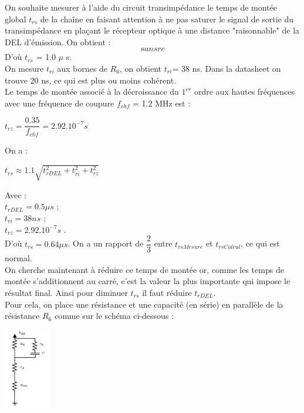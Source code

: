 \documentclass[a4paper]{report}
\begin{document}
On souhaite mesurer à l'aide du circuit transimpédance le temps de montée global $t_{rs}$ de la chaîne en faisant attention à ne pas saturer le signal de sortie du transimpédance en plaçant le récepteur optique à une distance "raisonnable" de la DEL d'émission. On obtient : \\
$$sansrc$$
D'où $t_{rs}$ = 1.0 $\mu$ s.\\
On mesure $t_{ri}$ aux bornes de $R_6$, on obtient $t_{ri}$= 38 ns. Dans la datasheet on trouve 20 ns, ce qui est plus ou moins cohérent.\\
Le temps de montée associé à la décroissance du $1^{er}$ ordre aux hautes fréquences avec une fréquence de coupure $f_{chf}$ = 1.2 MHz est : 
\begin{center}
$t_{rz}  = \dfrac{0.35}{f_{chf} } = 2.92.10^{-7} s$

\end{center}

On a : \\
\begin{center}
$t_{rs} \approx 1.1 \sqrt{t_{rDEL}^2 + t_{ri}^2 + t_{rz}^2 } $
\end{center}
Avec : \\
$t_{rDEL} = 0.5 \mu s$ ;\\
$t_{ri} =38 ns$ ; \\
$ t_{rz} = 2.92.10^{-7}s$ .\\
D'où $t_{rs} = 0.64 \mu  s$.
On a un rapport de $\dfrac{2}{3}$ entre $t_{rsMesure}$ et $t_{rsCalcul}$, ce qui est normal.\\
On cherche maintenant à réduire ce temps de montée or, comme les temps de montée s'additionnent au carré, c'est la valeur la plus importante qui impose le résultat final. Ainsi pour diminuer $t_{rs}$ il faut réduire $t_{rDEL}$.\\


Pour cela, on place une résistance et une capacité (en série) en parallèle de la résistance $R_6$ comme sur le schéma ci-dessous :

\begin{center}
\includegraphics[width=0.15\textwidth]{montage_amelio_trdel.PNG}
\end{center}
\end{document}
